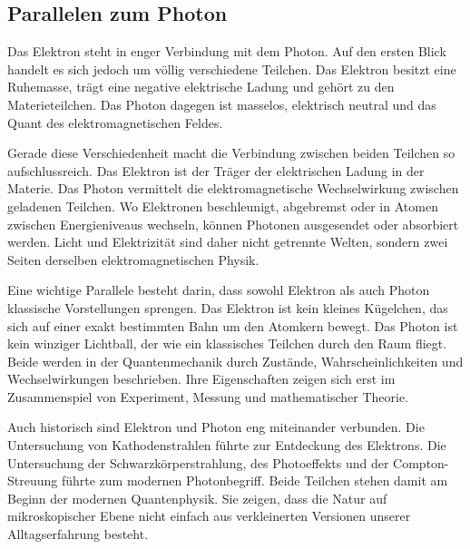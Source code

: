 \subsection{Parallelen zum Photon}
\label{sec:parallelen-zum-photon}

Das Elektron steht in enger Verbindung mit dem Photon.
Auf den ersten Blick handelt es sich jedoch um völlig verschiedene Teilchen. Das
Elektron besitzt eine Ruhemasse, trägt eine negative elektrische
Ladung und gehört zu den Materieteilchen. Das
Photon dagegen ist masselos, elektrisch neutral und das
Quant des elektromagnetischen Feldes.

Gerade diese Verschiedenheit macht die Verbindung zwischen beiden Teilchen so
aufschlussreich. Das Elektron ist der Träger der elektrischen Ladung in der Materie.
Das Photon vermittelt die elektromagnetische Wechselwirkung
zwischen geladenen Teilchen. Wo Elektronen beschleunigt, abgebremst oder in Atomen
zwischen Energieniveaus wechseln, können Photonen ausgesendet
oder absorbiert werden. Licht und Elektrizität sind daher nicht getrennte Welten,
sondern zwei Seiten derselben elektromagnetischen Physik.

Eine wichtige Parallele besteht darin, dass sowohl Elektron als auch Photon klassische
Vorstellungen sprengen. Das Elektron ist kein kleines Kügelchen, das sich auf einer
exakt bestimmten Bahn um den Atomkern bewegt. Das Photon ist kein winziger Lichtball,
der wie ein klassisches Teilchen durch den Raum fliegt. Beide werden in der
Quantenmechanik durch Zustände, Wahrscheinlichkeiten und
Wechselwirkungen beschrieben. Ihre Eigenschaften zeigen sich erst im Zusammenspiel
von Experiment, Messung und mathematischer Theorie.

Auch historisch sind Elektron und Photon eng miteinander verbunden. Die Untersuchung
von Kathodenstrahlen führte zur Entdeckung des Elektrons. Die
Untersuchung der Schwarzkörperstrahlung, des
Photoeffekts und der Compton-Streuung
führte zum modernen Photonbegriff. Beide Teilchen stehen damit am Beginn der modernen
Quantenphysik. Sie zeigen, dass die Natur auf mikroskopischer
Ebene nicht einfach aus verkleinerten Versionen unserer Alltagserfahrung besteht.

